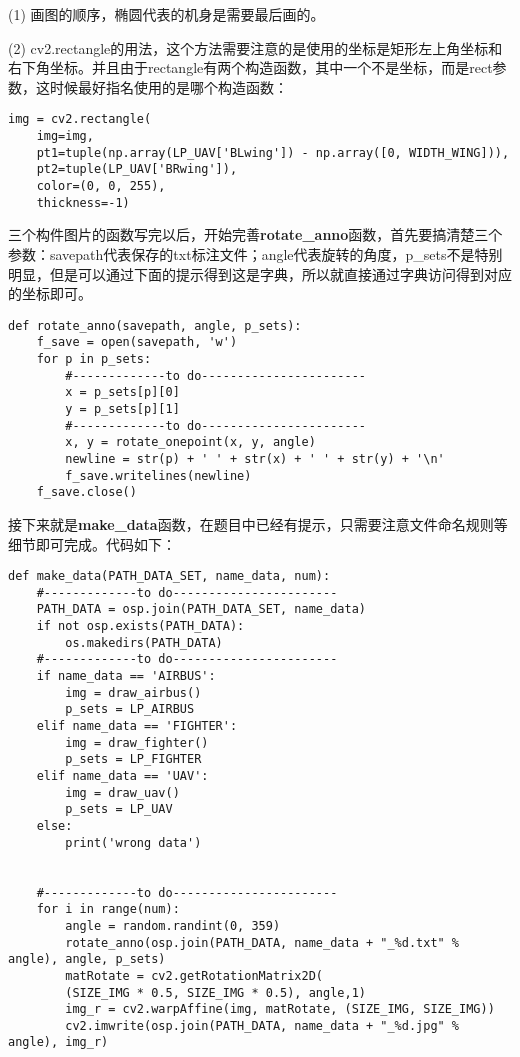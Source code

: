 \documentclass{article}
\begin{document}
    	(1) 画图的顺序，椭圆代表的机身是需要最后画的。
    	
    	(2) cv2.rectangle的用法，这个方法需要注意的是使用的坐标是矩形左上角坐标和右下角坐标。并且由于rectangle有两个构造函数，其中一个不是坐标，而是rect参数，这时候最好指名使用的是哪个构造函数：
    	
\begin{lstlisting}
img = cv2.rectangle(
	img=img,
	pt1=tuple(np.array(LP_UAV['BLwing']) - np.array([0, WIDTH_WING])),
	pt2=tuple(LP_UAV['BRwing']),
	color=(0, 0, 255),
	thickness=-1)
\end{lstlisting}

		三个构件图片的函数写完以后，开始完善\textbf{rotate\_anno}函数，首先要搞清楚三个参数：savepath代表保存的txt标注文件；angle代表旋转的角度，p\_sets不是特别明显，但是可以通过下面的提示得到这是字典，所以就直接通过字典访问得到对应的坐标即可。
\begin{lstlisting}
def rotate_anno(savepath, angle, p_sets):
	f_save = open(savepath, 'w')
	for p in p_sets:
		#-------------to do-----------------------
		x = p_sets[p][0]
		y = p_sets[p][1]
		#-------------to do-----------------------
		x, y = rotate_onepoint(x, y, angle)
		newline = str(p) + ' ' + str(x) + ' ' + str(y) + '\n'
		f_save.writelines(newline)
	f_save.close()	
\end{lstlisting}
    	
    	接下来就是\textbf{make\_data}函数，在题目中已经有提示，只需要注意文件命名规则等细节即可完成。代码如下：
    	
\begin{lstlisting}
def make_data(PATH_DATA_SET, name_data, num):
	#-------------to do-----------------------
	PATH_DATA = osp.join(PATH_DATA_SET, name_data)
	if not osp.exists(PATH_DATA):
		os.makedirs(PATH_DATA)
	#-------------to do-----------------------
	if name_data == 'AIRBUS':
		img = draw_airbus()
		p_sets = LP_AIRBUS
	elif name_data == 'FIGHTER':
		img = draw_fighter()
		p_sets = LP_FIGHTER
	elif name_data == 'UAV':
		img = draw_uav()
		p_sets = LP_UAV
	else:
		print('wrong data')
	
	
	#-------------to do-----------------------
	for i in range(num):
		angle = random.randint(0, 359)
		rotate_anno(osp.join(PATH_DATA, name_data + "_%d.txt" % angle), angle, p_sets)
		matRotate = cv2.getRotationMatrix2D(
		(SIZE_IMG * 0.5, SIZE_IMG * 0.5), angle,1) 
		img_r = cv2.warpAffine(img, matRotate, (SIZE_IMG, SIZE_IMG))
		cv2.imwrite(osp.join(PATH_DATA, name_data + "_%d.jpg" % angle), img_r)
	
\end{lstlisting}
    
\end{document}

